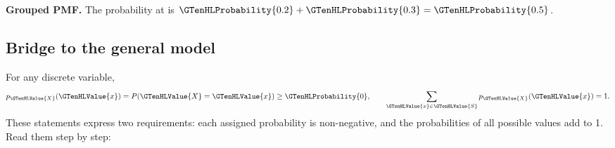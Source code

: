 \Needspace{6.8cm}
\par\noindent \begin{minipage}[t]{.485\linewidth}
\centering
{}
\par\small \textbf{Grouped PMF.} The probability at  is $\GTenHLProbability{0.2}+\GTenHLProbability{0.3}=\GTenHLProbability{0.5}$.
\end{minipage}\par\medskip


\subsection{Bridge to the general model}
\label{subsec:t2-c1-bridge-to-the-general-model}
For any discrete variable,
\[p_{\GTenHLValue{X}}(\GTenHLValue{x})=P(\GTenHLValue{X}=\GTenHLValue{x})\geq\GTenHLProbability{0},\qquad \sum_{\GTenHLValue{x}\in\GTenHLValue{S}}p_{\GTenHLValue{X}}(\GTenHLValue{x})=1.\]
These statements express two requirements: each assigned probability is non-negative, and the probabilities of all possible values add to 1. Read them step by step:
